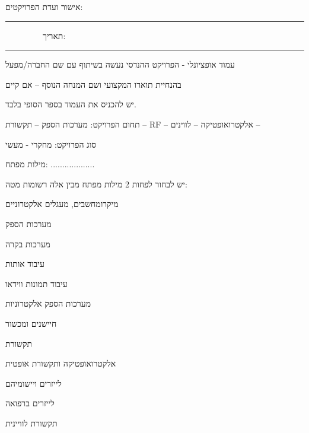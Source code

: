 \documentclass[12pt]{book}
\numberwithin{equation}{section}
\numberwithin{figure}{section}
\numberwithin{table}{section}
\begin{document}
אישור ועדת הפרויקטים: \rule{2cm}{1pt} ~~~~~~~~~תאריך: \rule{3cm}{1pt}



\newpage
\doublespacing


\fontsize{12pt}{15pt}
\selectfont

עמוד אופציונלי -  הפרויקט ההנדסי נעשה בשיתוף עם שם החברה/מפעל

בהנחיית תוארו המקצועי ושם המנחה הנוסף – אם קיים

\newpage


יש להכניס את העמוד בספר הסופי בלבד.

\vspace*{1cm}

תחום הפרויקט:   מערכות הספק – תקשורת – RF – אלקטרואופטיקה – לווינים –

\vspace*{1cm}

 סוג הפרויקט:   מחקרי - מעשי

 \vspace*{1cm}


\vspace*{1cm}

מילות מפתח: ...................

\vspace*{1cm}

יש לבחור לפחות 2 מילות מפתח מבין אלה רשומות מטה:

מיקרומחשבים, מעגלים אלקטרוניים 

מערכות הספק 

מערכות בקרה 


עיבוד אותות 

עיבוד תמונות ווידאו 

מערכות הספק אלקטרוניות 

חיישנים ומכשור 

תקשורת 

אלקטרואופטיקה ותקשורת אופטית 

לייזרים ויישומיהם 

לייזרים ברפואה 

תקשורת לוויינית 
\end{document}
